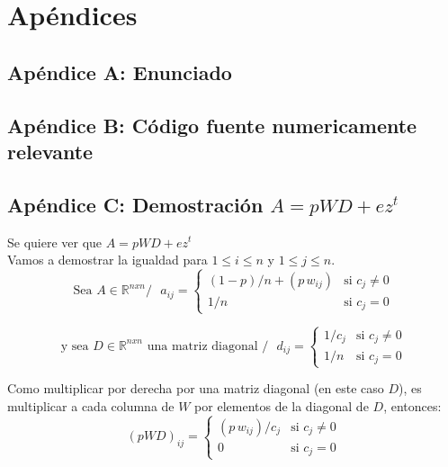 \section{Apéndices}

	\subsection{Apéndice A: Enunciado}
		

	\subsection{Apéndice B: Código fuente numericamente relevante}
	\clearpage

	\subsection{Apéndice C: Demostración $A = pWD + ez^{t}$}

		Se quiere ver que $A = pWD + e z^{t}$ \\

		Vamos a demostrar la igualdad para $1 \leq i \leq n$ y $1 \leq j \leq n$. \\

		\[ \text{Sea $A \in \mathbb{R}^{nxn} /$ } a_{ij} =
		        \begin{cases}
		                (1-p)/n + (p \, w_{ij})         & \text{si } c_{j}  \neq 0 \\
		                1    /n                         & \text{si } c_{j}   =   0
		        \end{cases}
		\]

		\[ \text{y sea $D \in \mathbb{R}^{nxn}$ una matriz diagonal $/$ } d_{ij} =
		        \begin{cases}
		                1/c_j         & \text{si } c_{j}  \neq 0 \\
		                1/n           & \text{si } c_{j}   =   0
		        \end{cases}
		\]

		Como multiplicar por derecha por una matriz diagonal (en este caso $D$), es multiplicar a cada columna de $W$ por elementos de la diagonal de $D$, entonces: \\

		\[ (pWD)_{ij} =
		        \begin{cases}
		                (p \, w_{ij})/c_j 	& \text{si } c_{j}  \neq 0 \\
		                0 			& \text{si } c_{j}   =   0
		        \end{cases}
		\]


